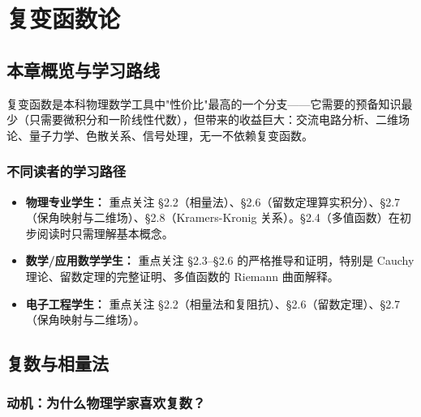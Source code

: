 
\chapter{复变函数论}

\section{本章概览与学习路线}

复变函数是本科物理数学工具中"性价比"最高的一个分支——它需要的预备知识最少（只需要微积分和一阶线性代数），但带来的收益巨大：交流电路分析、二维场论、量子力学、色散关系、信号处理，无一不依赖复变函数。

\begin{center}
\end{center}

\subsection*{不同读者的学习路径}

\begin{itemize}
\item \textbf{物理专业学生：} 重点关注 \S2.2（相量法）、\S2.6（留数定理算实积分）、\S2.7（保角映射与二维场）、\S2.8（Kramers-Kronig 关系）。\S2.4（多值函数）在初步阅读时只需理解基本概念。
\item \textbf{数学/应用数学学生：} 重点关注 \S2.3--\S2.6 的严格推导和证明，特别是 Cauchy 理论、留数定理的完整证明、多值函数的 Riemann 曲面解释。
\item \textbf{电子工程学生：} 重点关注 \S2.2（相量法和复阻抗）、\S2.6（留数定理）、\S2.7（保角映射与二维场）。
\end{itemize}

\section{复数与相量法}
\label{sec:complex_basics}

\subsection*{动机：为什么物理学家喜欢复数？}

